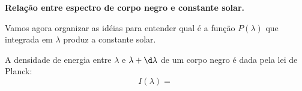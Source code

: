 \documentclass[12pt,a4paper]{article}
\begin{document}
	\begin{center} {\bf \large Relação entre espectro de corpo negro e constante solar.} \end{center}

	Vamos agora organizar as idéias para entender qual é a função $P(\lambda)$
	que integrada em $\lambda$ produz a constante solar.

	A densidade de energia entre $\lambda$ e $\lambda + \d \lambda$
	de um corpo negro é dada pela lei de Planck:
	\begin{equation}
		I(\lambda) = \frac{}{}
	\end{equation}
\end{document}
